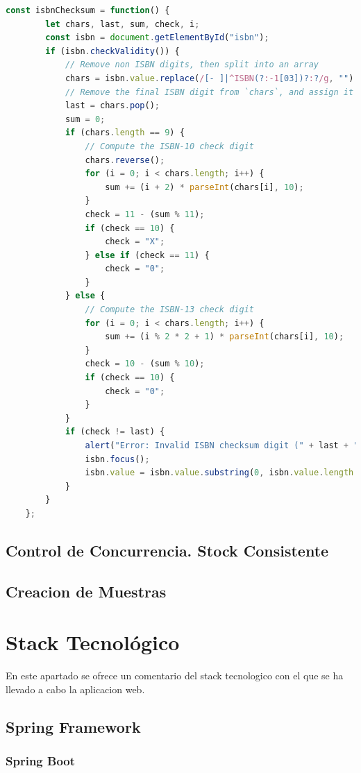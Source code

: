 \documentclass[a4paper]{report}
\begin{document}
    \begin{lstlisting}[language=JavaScript,caption=Validación del dígito de control del ISBN en cliente]
    const isbnChecksum = function() {
    	let chars, last, sum, check, i;
    	const isbn = document.getElementById("isbn");
    	if (isbn.checkValidity()) {
    		// Remove non ISBN digits, then split into an array
    		chars = isbn.value.replace(/[- ]|^ISBN(?:-1[03])?:?/g, "").split("");
    		// Remove the final ISBN digit from `chars`, and assign it to `last`
    		last = chars.pop();
    		sum = 0;
    		if (chars.length == 9) {
    			// Compute the ISBN-10 check digit
    			chars.reverse();
    			for (i = 0; i < chars.length; i++) {
    				sum += (i + 2) * parseInt(chars[i], 10);
    			}
    			check = 11 - (sum % 11);
    			if (check == 10) {
    				check = "X";
    			} else if (check == 11) {
    				check = "0";
    			}
    		} else {
    			// Compute the ISBN-13 check digit
    			for (i = 0; i < chars.length; i++) {
    				sum += (i % 2 * 2 + 1) * parseInt(chars[i], 10);
    			}
    			check = 10 - (sum % 10);
    			if (check == 10) {
    				check = "0";
    			}
    		}
    		if (check != last) {
    			alert("Error: Invalid ISBN checksum digit (" + last + "). Try with (" + check + ")");
    			isbn.focus();
    			isbn.value = isbn.value.substring(0, isbn.value.length - 1);
    		}
    	}
    };
    \end{lstlisting}
    
    \subsection{Control de Concurrencia. Stock Consistente}
    \subsection{Creacion de Muestras}

    \section{Stack Tecnológico}
    En este apartado se ofrece un comentario del stack tecnologico con el que se ha llevado a cabo la aplicacion web.

    \subsection{Spring Framework}
    \subsubsection{Spring Boot}
\end{document}
